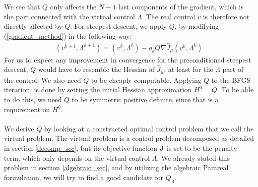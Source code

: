 We see that $Q$ only affects the $N-1$ last components of the gradient, which is the part connected with the virtual control $\Lambda$. The real control $v$ is therefore not directly affected by $Q$. For steepest descent, we apply $Q$, by modifying (\ref{gradient_method}) in the following way:
\begin{align}
(v^{k+1},\Lambda^{k+1}) = (v^{k},\Lambda^{k}) -\rho_kQ\nabla\hat{J}_{\mu}(v^{k},\Lambda^{k}) \label{gradient_method2}
\end{align}
For us to expect any improvement in convergence for the preconditioned steepest descent, $Q$ would have to resemble the Hessian of $\hat{J}_{\mu}$, at least for the $\Lambda$ part of the control. We also need $Q$ to be cheaply computable. Applying $Q$ to the BFGS iteration, is done by setting the initial Hessian approximation $H^0=Q$. To be able to do this, we need $Q$ to be symmetric positive definite, since that is a requirement on $H^0$. 
\\
\\
We derive $Q$ by looking at a constructed optimal control problem that we call the virtual problem. The virtual problem is a control problem decomposed as detailed in section \ref{decomp_sec}, but its objective function $\bold J$ is set to be the penalty term, which only depends on the virtual control $\Lambda$. We already stated this problem in section \ref{algebraic_sec}, and by utilizing the algebraic Parareal formulation, we will try to find a good candidate for $Q_{\Lambda}$.
